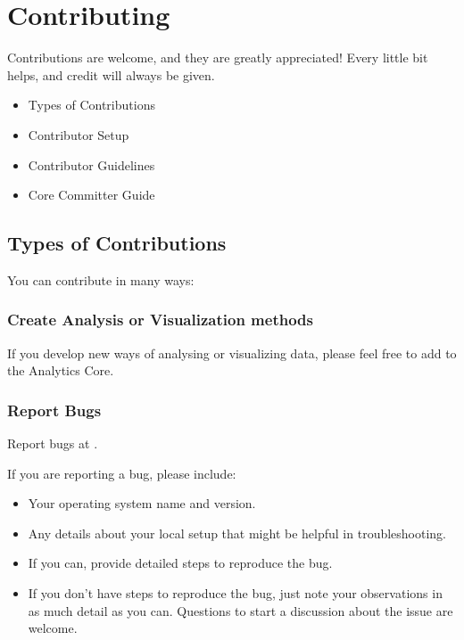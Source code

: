 \documentclass[letterpaper,10pt,english]{sphinxmanual}
\begin{document}
\section{Contributing}
\label{\detokenize{MANIFEST:contributing}}
Contributions are welcome, and they are greatly appreciated! Every little bit helps, and credit will always be given.
\begin{itemize}
\item {} 
Types of Contributions {\hyperref[\detokenize{MANIFEST:types-of-contributions}]{}}

\item {} 
Contributor Setup {\hyperref[\detokenize{MANIFEST:setting-up-the-code-for-local-development}]{}}

\item {} 
Contributor Guidelines {\hyperref[\detokenize{MANIFEST:contributor-guidelines}]{}}

\item {} 
Core Committer Guide {\hyperref[\detokenize{MANIFEST:core-committer-guide}]{}}

\end{itemize}


\subsection{Types of Contributions}
\label{\detokenize{MANIFEST:types-of-contributions}}
You can contribute in many ways:


\subsubsection{Create Analysis or Visualization methods}
\label{\detokenize{MANIFEST:create-analysis-or-visualization-methods}}
If you develop new ways of analysing or visualizing data, please feel free to add to the Analytics Core.


\subsubsection{Report Bugs}
\label{\detokenize{MANIFEST:report-bugs}}
Report bugs at .

If you are reporting a bug, please include:
\begin{itemize}
\item {} 
Your operating system name and version.

\item {} 
Any details about your local setup that might be helpful in troubleshooting.

\item {} 
If you can, provide detailed steps to reproduce the bug.

\item {} 
If you don’t have steps to reproduce the bug, just note your observations in as much detail as you can. Questions to start a discussion about the issue are welcome.

\end{itemize}
\end{document}
